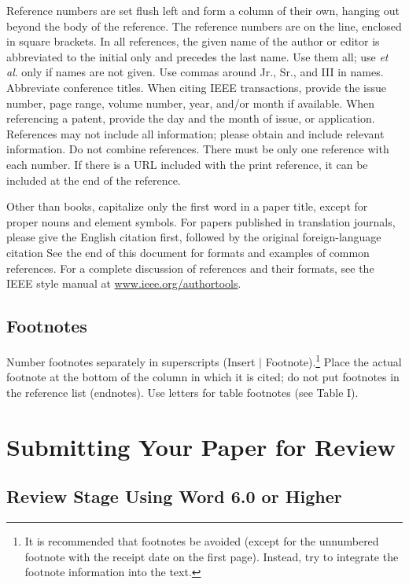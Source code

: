 \documentclass[journal]{IEEEtai}
\begin{document}
Reference numbers are set flush left and form a column of their own, hanging out beyond the body of the reference. The reference numbers are on the line, enclosed in square brackets. In all references, the given name of the author or editor is abbreviated to the initial only and precedes the last name. Use them all; use {\it et al}. only if names are not given. Use commas around Jr., Sr., and III in names. Abbreviate conference titles. When citing IEEE transactions, provide the issue number, page range, volume number, year, and/or month if available. When referencing a patent, provide the day and the month of issue, or application. References may not include all information; please obtain and include relevant information. Do not combine references. There must be only one reference with each number. If there is a URL included with the print reference, it can be included at the end of the reference. 

Other than books, capitalize only the first word in a paper title, except for proper nouns and element symbols. For papers published in translation journals, please give the English citation first, followed by the original foreign-language citation See the end of this document for formats and examples of common references. For a complete discussion of references and their formats, see the IEEE style manual at \underline{www.ieee.org/authortools}.

\subsection{Footnotes}

Number footnotes separately in superscripts (Insert $|$ Footnote).\footnote{It is recommended that footnotes be avoided (except for the unnumbered footnote with the receipt date on the first page). Instead, try to integrate the footnote information into the text.}  Place the actual footnote at the bottom of the column in which it is cited; do not put footnotes in the reference list (endnotes). Use letters for table footnotes (see Table I). 

\section{Submitting Your Paper for Review}

\subsection{Review Stage Using Word 6.0 or Higher}
\end{document}
